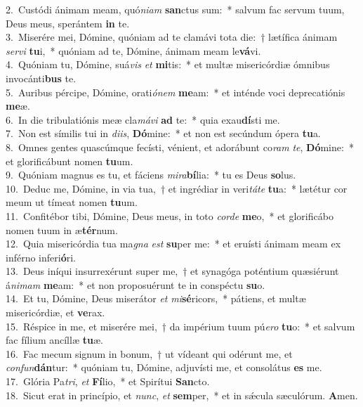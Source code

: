 {2.~}Custódi ánimam meam, quó\textit{ni}\textit{am} \textbf{san}ctus sum:~* salvum fac servum tuum, Deus meus, sperántem \textbf{in} te.\\
{3.~}Miserére mei, Dómine, quóniam ad te clamávi tota die:~† lætífica ánimam \textit{ser}\textit{vi} \textbf{tu}i,~* quóniam ad te, Dómine, ánimam meam le\textbf{vá}vi.\\
{4.~}Quóniam tu, Dómine, suá\textit{vis} \textit{et} \textbf{mi}tis:~* et multæ misericórdiæ ómnibus invocánti\textbf{bus} te.\\
{5.~}Auribus pércipe, Dómine, orati\textit{ó}\textit{nem} \textbf{me}am:~* et inténde voci deprecatiónis \textbf{me}æ.\\
{6.~}In die tribulatiónis meæ cla\textit{má}\textit{vi} \textbf{ad} te:~* quia exau\textbf{dí}sti me.\\
{7.~}Non est símilis tui in \textit{di}\textit{is}, \textbf{Dó}mine:~* et non est secúndum ópera \textbf{tu}a.\\
{8.~}Omnes gentes quascúmque fecísti, vénient, et adorábunt co\textit{ram} \textit{te}, \textbf{Dó}mine:~* et glorificábunt nomen \textbf{tu}um.\\
{9.~}Quóniam magnus es tu, et fáciens \textit{mi}\textit{ra}\textbf{bí}lia:~* tu es Deus \textbf{so}lus.\\
{10.~}Deduc me, Dómine, in via tua,~† et ingrédiar in veri\textit{tá}\textit{te} \textbf{tu}a:~* lætétur cor meum ut tímeat nomen \textbf{tu}um.\\
{11.~}Confitébor tibi, Dómine, Deus meus, in toto \textit{cor}\textit{de} \textbf{me}o,~* et glorificábo nomen tuum in æ\textbf{tér}num.\\
{12.~}Quia misericórdia tua ma\textit{gna} \textit{est} \textbf{su}per me:~* et eruísti ánimam meam ex inférno inferi\textbf{ó}ri.\\
{13.~}Deus iníqui insurrexérunt super me,~† et synagóga poténtium quæsiérunt á\textit{ni}\textit{mam} \textbf{me}am:~* et non proposuérunt te in conspéctu \textbf{su}o.\\
{14.~}Et tu, Dómine, Deus miserátor \textit{et} \textit{mi}\textbf{sé}ricors,~* pátiens, et multæ misericórdiæ, et \textbf{ve}rax.\\
{15.~}Réspice in me, et miserére mei,~† da impérium tuum pú\textit{e}\textit{ro} \textbf{tu}o:~* et salvum fac fílium ancíllæ \textbf{tu}æ.\\
{16.~}Fac mecum signum in bonum,~† ut vídeant qui odérunt me, et \textit{con}\textit{fun}\textbf{dán}tur:~* quóniam tu, Dómine, adjuvísti me, et consolátus \textbf{es} me.\\
{17.~}Glória Pa\textit{tri}, \textit{et} \textbf{Fí}lio,~* et Spirítui \textbf{San}cto.\\
{18.~}Sicut erat in princípio, et \textit{nunc}, \textit{et} \textbf{sem}per,~* et in sǽcula sæculórum. \textbf{A}men.\\
